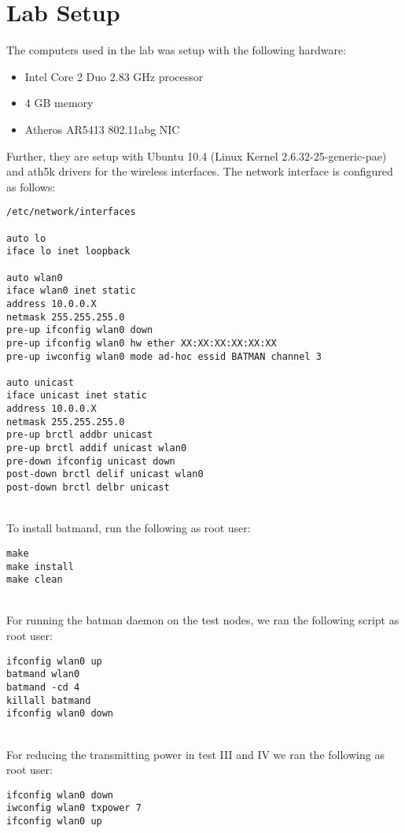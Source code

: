 \chapter{Lab Setup}
\label{appendix:lab_setup}


The computers used in the lab was setup with the following hardware:

\begin{itemize}
\item Intel Core 2 Duo 2.83 GHz processor
\item 4 GB memory
\item Atheros AR5413 802.11abg NIC
\end{itemize}

\noindent
Further, they are setup with Ubuntu 10.4 (Linux Kernel 2.6.32-25-generic-pae) and ath5k drivers for the wireless interfaces. The network interface is configured as follows:


\begin{lstlisting}[frame=tb]
/etc/network/interfaces

auto lo
iface lo inet loopback

auto wlan0
iface wlan0 inet static
address 10.0.0.X
netmask 255.255.255.0
pre-up ifconfig wlan0 down
pre-up ifconfig wlan0 hw ether XX:XX:XX:XX:XX:XX
pre-up iwconfig wlan0 mode ad-hoc essid BATMAN channel 3

auto unicast
iface unicast inet static
address 10.0.0.X
netmask 255.255.255.0
pre-up brctl addbr unicast
pre-up brctl addif unicast wlan0
pre-down ifconfig unicast down
post-down brctl delif unicast wlan0
post-down brctl delbr unicast
\end{lstlisting}

\noindent
\\
To install batmand, run the following as root user:

\begin{lstlisting}[frame=tb]
make
make install
make clean
\end{lstlisting}

\noindent
\\
For running the batman daemon on the test nodes, we ran the following script as root user:

\begin{lstlisting}[frame=tb]
ifconfig wlan0 up
batmand wlan0
batmand -cd 4
killall batmand
ifconfig wlan0 down
\end{lstlisting}

\noindent
\\
For reducing the transmitting power in test III and IV we ran the following as root user:

\begin{lstlisting}[frame=tb]
ifconfig wlan0 down
iwconfig wlan0 txpower 7
ifconfig wlan0 up
\end{lstlisting}


